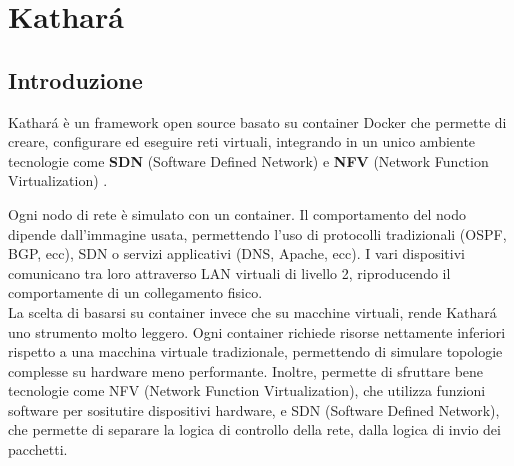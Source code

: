 \chapter{Kathará}
\section{Introduzione}
\begin{defn}[Kathará]
  Kathará è un framework open source basato su container Docker che permette di creare, configurare ed eseguire reti virtuali,
  integrando in un unico ambiente tecnologie come \textbf{SDN} (Software Defined Network) e \textbf{NFV} (Network Function Virtualization) \cite{8406267}.
\end{defn}
Ogni nodo di rete è simulato con un container. Il comportamento del nodo dipende dall'immagine usata,
permettendo l'uso di protocolli tradizionali (OSPF, BGP, ecc), SDN o servizi applicativi (DNS, Apache, ecc).
I vari dispositivi comunicano tra loro attraverso LAN virtuali di livello 2, riproducendo il comportamente di un collegamento fisico.\\
\vspace*{0.01\textheight}
La scelta di basarsi su container invece che su macchine virtuali, rende Kathará uno strumento molto leggero.
Ogni container richiede risorse nettamente inferiori rispetto a una macchina virtuale tradizionale, permettendo di simulare topologie complesse su hardware meno performante.
Inoltre, permette di sfruttare bene tecnologie come NFV (Network Function Virtualization), che utilizza funzioni software per sositutire dispositivi hardware,
e SDN (Software Defined Network), che permette di separare la logica di controllo della rete, dalla logica di invio dei pacchetti.

